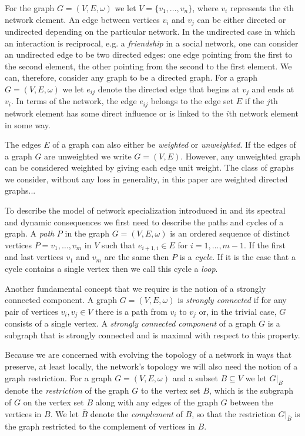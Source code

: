 \documentclass[10pt]{elsarticle}
\theoremstyle{remark}
\begin{document}
For the graph $G=(V,E,\omega)$ we let $V=\{v_1,\dots,v_n\}$, where $v_i$ represents the $i$th network element. An edge between vertices $v_i$ and $v_j$ can be either directed or undirected depending on the particular network. In the undirected case in which an interaction is reciprocal, e.g. a \emph{friendship} in a social network, one can consider an undirected edge to be two directed edges: one edge pointing from the first to the second element, the other pointing from the second to the first element. We can, therefore, consider any graph to be a directed graph. For a graph $G=(V,E,\omega)$ we let $e_{ij}$ denote the directed edge that begins at $v_j$ and ends at $v_i$. In terms of the network, the edge $e_{ij}$ belongs to the edge set $E$ if the $j$th network element has some direct influence or is linked to the $i$th network element in some way.

The edges $E$ of a graph can also either be \emph{weighted} or \emph{unweighted}. If the edges of a graph $G$ are unweighted we write $G=(V,E)$. However, any unweighted graph can be considered weighted by giving each edge unit weight. The class of graphs we consider, without any loss in generality, in this paper are weighted directed graphs...

To describe the model of network specialization introduced in \cite{BSW18} and its spectral and dynamic consequences we first need to describe the paths and cycles of a graph. A \emph{path} $P$ in the graph $G=(V,E,\omega)$ is an ordered sequence of distinct vertices $P=v_1,\dots,v_m$ in $V$ such that $e_{i+1,i}\in E$ for $i=1,\dots,m-1$. If the first and last vertices $v_1$ and $v_m$ are the same then $P$ is a \emph{cycle}. If it is the case that a cycle contains a single vertex then we call this cycle a \emph{loop}.

Another fundamental concept that we require is the notion of a strongly connected component. A graph $G=(V,E,\omega)$ is \emph{strongly connected} if for any pair of vertices $v_i,v_j\in V$ there is a path from $v_i$ to $v_j$ or, in the trivial case, $G$ consists of a single vertex. A \emph{strongly connected component} of a graph $G$ is a subgraph that is strongly connected and is maximal with respect to this property.

Because we are concerned with evolving the topology of a network in ways that preserve, at least locally, the network's topology we will also need the notion of a graph restriction. For a graph $G=(V,E,\omega)$ and a subset $B\subseteq V$ we let $G|_{B}$ denote the \emph{restriction} of the graph $G$ to the vertex set $B$, which is the subgraph of $G$ on the vertex set $B$ along with any edges of the graph $G$ between the vertices in $B$. We let $\bar{B}$ denote the \emph{complement} of $B$, so that the restriction $G|_{\bar{B}}$ is the graph restricted to the complement of vertices in $B$.
\end{document}
